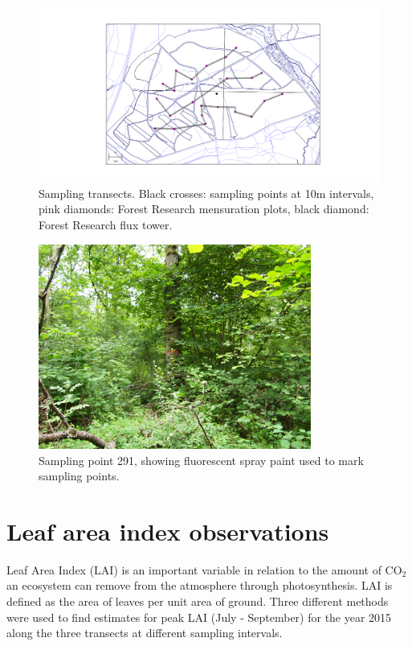 \begin{figure}[ht]
    \centering
    \includegraphics[width=\textwidth]{chapter/chapter4/straitsmap_threet_10m.png}
    \caption{Sampling transects. Black crosses: sampling points at 10m intervals, pink diamonds: Forest Research mensuration plots, black diamond: Forest Research flux tower.} \label{chap4:fig:transects}
\end{figure}

\begin{figure}[ht]
    \centering
    \includegraphics[width=0.8\textwidth]{chapter/chapter4/291E.jpg}
    \caption{Sampling point 291, showing fluorescent spray paint used to mark sampling points.} \label{chap4:fig:pink_tree}
\end{figure}

\section{Leaf area index observations}

Leaf Area Index (LAI) is an important variable in relation to the amount of CO\(_2\) an ecosystem can remove from the atmosphere through photosynthesis. LAI is defined as the area of leaves per unit area of ground. Three different methods were used to find estimates for peak LAI (July - September) for the year 2015 along the three transects at different sampling intervals.

